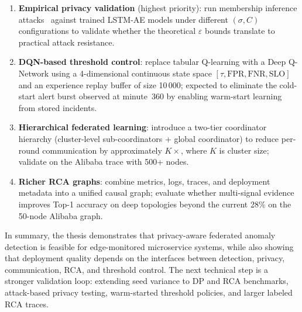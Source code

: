 \begin{enumerate}
    \item \textbf{Empirical privacy validation} (highest priority): run
    membership inference attacks~\cite{shokri2017membership} against trained
    LSTM-AE models under different $(\sigma, C)$ configurations to validate
    whether the theoretical $\varepsilon$ bounds translate to practical attack
    resistance.

    \item \textbf{DQN-based threshold control}: replace tabular Q-learning
    with a Deep Q-Network using a 4-dimensional continuous state space
    $[\tau, \text{FPR}, \text{FNR}, \text{SLO}]$ and an experience replay
    buffer of size 10\,000; expected to eliminate the cold-start alert burst
    observed at minute~360 by enabling warm-start learning from stored
    incidents.

    \item \textbf{Hierarchical federated learning}: introduce a two-tier
    coordinator hierarchy (cluster-level sub-coordinators + global
    coordinator) to reduce per-round communication by approximately
    $K\times$, where $K$ is cluster size; validate on the Alibaba trace with
    500+ nodes.

    \item \textbf{Richer RCA graphs}: combine metrics, logs, traces, and
    deployment metadata into a unified causal graph; evaluate whether
    multi-signal evidence improves Top-1 accuracy on deep topologies beyond
    the current 28\% on the 50-node Alibaba graph.
\end{enumerate}

In summary, the thesis demonstrates that privacy-aware federated anomaly
detection is feasible for edge-monitored microservice systems, while also
showing that deployment quality depends on the interfaces between detection,
privacy, communication, RCA, and threshold control. The next technical step is
a stronger validation loop: extending seed variance to DP and RCA benchmarks,
attack-based privacy testing, warm-started threshold policies, and larger
labeled RCA traces.
